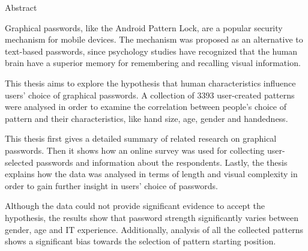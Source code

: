
{\centering 

	{\Huge Abstract}

	\vspace{1cm}
	
	Graphical passwords, like the Android Pattern Lock, are a popular security mechanism for mobile devices. The mechanism was proposed as an alternative to text-based passwords, since psychology studies have recognized that the human brain have a superior memory for remembering and recalling visual information.

	This thesis aims to explore the hypothesis that human characteristics influence users’ choice of graphical passwords. A collection of 3393 user-created patterns were analysed in order to examine the correlation between people’s choice of pattern and their characteristics, like hand size, age, gender and handedness.

	This thesis first gives a detailed summary of related research on graphical passwords. Then it shows how an online survey was used for collecting user-selected passwords and information about the respondents. Lastly, the thesis explains how the data was analysed in terms of length and visual complexity in order to gain further insight in users’ choice of passwords.

	Although the data could not provide significant evidence to accept the hypothesis, the results show that password strength significantly varies between gender, age and IT experience. Additionally, analysis of all the collected patterns shows a significant bias towards the selection of pattern starting position.


}
\clearpage
\mbox{}
\thispagestyle{empty}
\newpage

